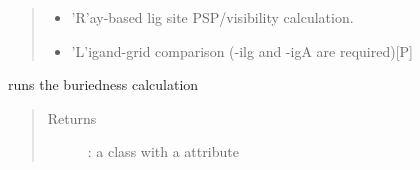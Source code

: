 \documentclass[letterpaper,10pt,english]{sphinxmanual}
\begin{document}
\begin{fulllineitems}
\begin{fulllineitems}
\begin{quote}
\begin{description}
\begin{itemize}
\begin{itemize}
\item {} 
’R’ay-based lig site PSP/visibility calculation.

\item {} 
’L’igand-grid comparison (-ilg and -igA are required){[}P{]}

\end{itemize}


\end{itemize}

\end{description}\end{quote}

\end{fulllineitems}


\begin{fulllineitems}
\label{\detokenize{calculation_api:hotspots.calculation.Buriedness.calculate}}
runs the buriedness calculation
\begin{quote}\begin{description}
\item[{Returns}] \leavevmode
{}: a class with a  attribute

\end{description}\end{quote}

\end{fulllineitems}


\end{fulllineitems}

\end{document}
